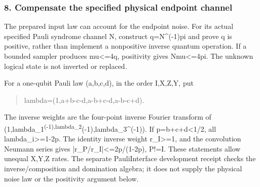 \documentclass[
]{article}
\begin{document}
\subsubsection{8. Compensate the specified physical endpoint
channel}\label{compensate-the-specified-physical-endpoint-channel}

The prepared input law can account for the endpoint noise. For its
actual specified Pauli syndrome channel N, construct q=N\^{}(-1)pi and
prove q is positive, rather than implement a nonpositive inverse quantum
operation. If a bounded sampler produces mu\textless=4q, positivity
gives Nmu\textless=4pi. The unknown logical state is not inverted or
replaced.

For a one-qubit Pauli law (a,b,c,d), in the order I,X,Z,Y, put

\begin{quote}\small\ttfamily\raggedright\setlength{\parskip}{0pt}
\noindent l\allowbreak{}a\allowbreak{}m\allowbreak{}b\allowbreak{}d\allowbreak{}a\allowbreak{}=\allowbreak{}(\allowbreak{}1\allowbreak{},\allowbreak{}a\allowbreak{}+\allowbreak{}b\allowbreak{}-\allowbreak{}c\allowbreak{}-\allowbreak{}d\allowbreak{},\allowbreak{}a\allowbreak{}-\allowbreak{}b\allowbreak{}+\allowbreak{}c\allowbreak{}-\allowbreak{}d\allowbreak{},\allowbreak{}a\allowbreak{}-\allowbreak{}b\allowbreak{}-\allowbreak{}c\allowbreak{}+\allowbreak{}d\allowbreak{})\allowbreak{}.\par
\end{quote}

The inverse weights are the four-point inverse Fourier transform of
(1,lambda\_1\textsuperscript{(-1),lambda\_2}(\allowbreak{}-\allowbreak{}1\allowbreak{})\allowbreak{},\allowbreak{}l\allowbreak{}a\allowbreak{}m\allowbreak{}b\allowbreak{}d\allowbreak{}a\allowbreak{}\_\allowbreak{}3\allowbreak{}\^{}\allowbreak{}(\allowbreak{}-\allowbreak{}1\allowbreak{})\allowbreak{})\allowbreak{}.
If p=b+c+d\textless1/2, all
l\allowbreak{}a\allowbreak{}m\allowbreak{}b\allowbreak{}d\allowbreak{}a\allowbreak{}\_\allowbreak{}i\allowbreak{}>\allowbreak{}=\allowbreak{}1\allowbreak{}-\allowbreak{}2\allowbreak{}p\allowbreak{}.
The identity inverse weight r\_I\textgreater=1, and the convolution
Neumann series gives
|\allowbreak{}r\allowbreak{}\_\allowbreak{}P\allowbreak{}/\allowbreak{}r\allowbreak{}\_\allowbreak{}I\allowbreak{}|\allowbreak{}<\allowbreak{}=\allowbreak{}2\allowbreak{}p\allowbreak{}/\allowbreak{}(\allowbreak{}1\allowbreak{}-\allowbreak{}2\allowbreak{}p\allowbreak{})\allowbreak{},
P!=I. These statements allow unequal X,Y,Z rates. The separate
PauliInterface development receipt checks the
i\allowbreak{}n\allowbreak{}v\allowbreak{}e\allowbreak{}r\allowbreak{}s\allowbreak{}e\allowbreak{}/\allowbreak{}c\allowbreak{}o\allowbreak{}m\allowbreak{}p\allowbreak{}o\allowbreak{}s\allowbreak{}i\allowbreak{}t\allowbreak{}i\allowbreak{}o\allowbreak{}n
and domination algebra; it does not supply the physical noise law or the
positivity argument below.
\end{document}
